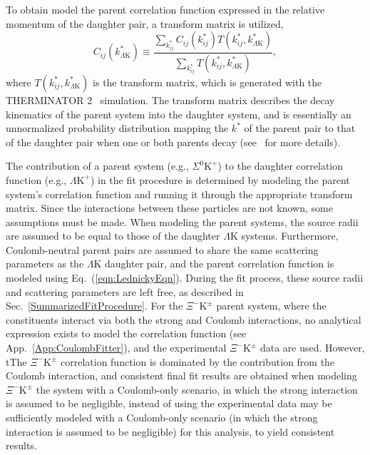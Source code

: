 \documentclass[ALICE,manyauthors]{cernphprep}
\newcommand{\kstar}{$k^{*}$\xspace}
\newcommand{\KchP}{$\mathrm{K^{+}}$\xspace}
\newcommand{\LamK}{$\Lambda$K\xspace}
\newcommand{\LamKchP}{$\Lambda\mathrm{K^{+}}$\xspace}
\newcommand{\XiKpm}{$\Xi^{-}\mathrm{K^{\pm}}$\xspace}
\begin{document}
To {\color{red}obtain} {\color{blue}model} the parent correlation function expressed in the relative momentum of the daughter pair, a transform matrix is utilized,
\begin{equation}
  C_{ij}(k^{*}_{\Lambda\mathrm{K}}) \equiv \frac{\sum\limits_{k^{*}_{ij}} C_{ij}\left(k^{*}_{ij}\right) T\left(k^{*}_{ij},k^{*}_{\Lambda\mathrm{K}}\right)}{\sum\limits_{k^{*}_{ij}} T\left(k^{*}_{ij},k^{*}_{\Lambda\mathrm{K}}\right)},
\label{eqn:ResidualsTransform}
\end{equation}
where $T(k^{*}_{ij},k^{*}_{\Lambda\mathrm{K}})$ is the transform matrix, which is generated with the THERMINATOR 2~\cite{Chojnacki:2011hb} simulation. 
The transform matrix describes the decay kinematics of the parent system into the daughter {\color{blue}system}, and is essentially an unnormalized probability distribution mapping the \kstar of the parent pair to that of the daughter pair when one or both parents decay (see~\cite{Kisiel:2014mma} for more details).

The contribution of a parent system (e.g., $\Sigma^{0}$\KchP) to the daughter correlation function (e.g., \LamKchP) {\color{blue}in the fit procedure} is determined by modeling the parent system's correlation function and running it through the appropriate transform matrix.
Since the interactions between these particles are not known, some assumptions must be made.
When modeling the parent systems, the source radii are assumed to be equal to those of the daughter \LamK systems.
Furthermore, Coulomb-neutral parent pairs are assumed to share the same scattering parameters as the \LamK daughter pair, and the parent correlation function is modeled using Eq.~{\color{blue}(}\ref{eqn:LednickyEqn}{\color{blue})}.
During the fit process, these source radii and scattering parameters are left free, as described in Sec.~\ref{SummarizedFitProcedure}.
For the \XiKpm parent system, where the constituents interact via both the strong and Coulomb interactions, no analytical expression exists to model the correlation function (see App.~\ref{App:CoulombFitter}), and the experimental \XiKpm data are used.
{\color{blue}However, t}{\color{red}T}he \XiKpm correlation function is dominated by the contribution from the Coulomb interaction, and {\color{red}consistent final fit results are obtained when modeling \XiKpm the system with a Coulomb-only scenario, in which the strong interaction is assumed to be negligible, instead of using the experimental data} {\color{blue}may be sufficiently modeled with a Coulomb-only scenario (in which the strong interaction is assumed to be negligible) for this analysis, to yield consistent results}.
\end{document}
